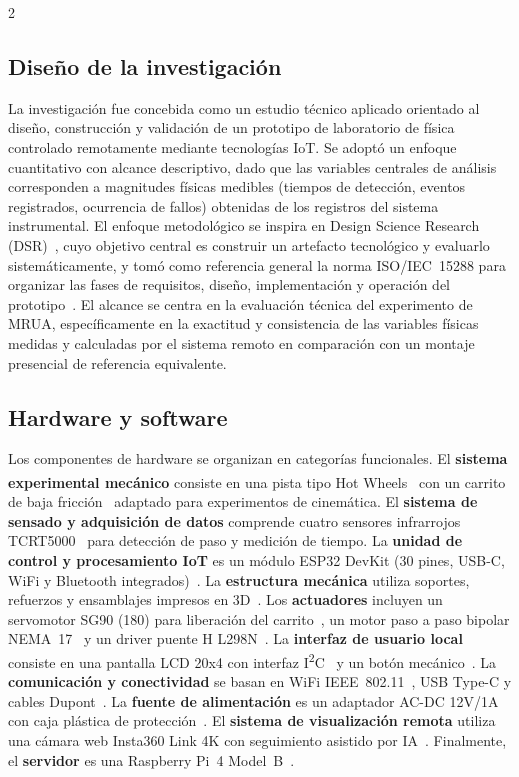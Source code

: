 \documentclass[12pt,twoside,titlepage]{ingenius}
\begin{document}
\begin{multicols}{2}
\subsection{Dise\~no de la investigaci\'on}

La investigaci\'on fue concebida como un estudio t\'ecnico aplicado orientado al dise\~no, construcci\'on y validaci\'on de un prototipo de laboratorio de f\'isica controlado remotamente mediante tecnolog\'ias IoT. Se adopt\'o un enfoque cuantitativo con alcance descriptivo, dado que las variables centrales de an\'alisis corresponden a magnitudes f\'isicas medibles (tiempos de detecci\'on, eventos registrados, ocurrencia de fallos) obtenidas de los registros del sistema instrumental. El enfoque metodol\'ogico se inspira en Design Science Research (DSR)~\cite{r16}, cuyo objetivo central es construir un artefacto tecnol\'ogico y evaluarlo sistem\'aticamente, y tom\'o como referencia general la norma ISO/IEC~15288 para organizar las fases de requisitos, dise\~no, implementaci\'on y operaci\'on del prototipo~\cite{r17}. El alcance se centra en la evaluaci\'on t\'ecnica del experimento de MRUA, espec\'ificamente en la exactitud y consistencia de las variables f\'isicas medidas y calculadas por el sistema remoto en comparaci\'on con un montaje presencial de referencia equivalente.

\subsection{Hardware y software}

Los componentes de hardware se organizan en categor\'ias funcionales. El \textbf{sistema experimental mec\'anico} consiste en una pista tipo Hot Wheels\textsuperscript{\textregistered}~\cite{r18} con un carrito de baja fricci\'on~\cite{r19} adaptado para experimentos de cinem\'atica. El \textbf{sistema de sensado y adquisici\'on de datos} comprende cuatro sensores infrarrojos TCRT5000~\cite{r20} para detecci\'on de paso y medici\'on de tiempo. La \textbf{unidad de control y procesamiento IoT} es un m\'odulo ESP32 DevKit (30 pines, USB-C, WiFi y Bluetooth integrados)~\cite{r21,r53}. La \textbf{estructura mec\'anica} utiliza soportes, refuerzos y ensamblajes impresos en 3D~\cite{r22,r23,r24,r25}. Los \textbf{actuadores} incluyen un servomotor SG90 (180\textdegree) para liberaci\'on del carrito~\cite{r26}, un motor paso a paso bipolar NEMA~17~\cite{r27} y un driver puente H L298N~\cite{r28}. La \textbf{interfaz de usuario local} consiste en una pantalla LCD 20x4 con interfaz I\textsuperscript{2}C~\cite{r29} y un bot\'on mec\'anico~\cite{r30}. La \textbf{comunicaci\'on y conectividad} se basan en WiFi IEEE~802.11~\cite{r31,r32}, USB Type-C y cables Dupont~\cite{r33}. La \textbf{fuente de alimentaci\'on} es un adaptador AC-DC 12V/1A con caja pl\'astica de protecci\'on~\cite{r34,r35}. El \textbf{sistema de visualizaci\'on remota} utiliza una c\'amara web Insta360 Link 4K con seguimiento asistido por IA~\cite{r36}. Finalmente, el \textbf{servidor} es una Raspberry Pi~4 Model~B~\cite{r37}.


\end{multicols}
\end{document}
